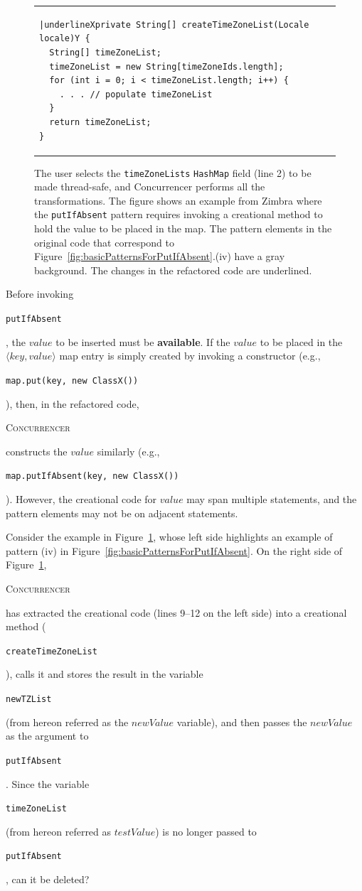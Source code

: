 \documentclass[10pt,twocolumn]{article}
\newcommand{\tool}{\begin{scriptsize}\textsc{Concurrencer}\end{scriptsize}\xspace}
\newenvironment{CodeOut}{\begin{scriptsize}}{\end{scriptsize}}
\newcommand{\code}[1]{\begin{smaller}\texttt{#1}\end{smaller}}
\newcommand{\codex}[1]{{\smaller\texttt{#1}}\xspace}
\newcommand{\MaxWidth}{\columnwidth}
\begin{document}
\begin{figure}[t]
\begin{CodeOut}
\begin{tabular}{@{}l|l@{}}
\begin{minipage}[t]{\MaxWidth}
\begin{Verbatim}[commandchars=\|XY]
|underlineXprivate String[] createTimeZoneList(Locale locale)Y {
  String[] timeZoneList;
  timeZoneList = new String[timeZoneIds.length];
  for (int i = 0; i < timeZoneList.length; i++) {
    . . . // populate timeZoneList
  }
  return timeZoneList;
}
\end{Verbatim}
\end{minipage}
\end{tabular}
\end{CodeOut}
\caption{The user selects the \codex{timeZoneLists} \codex{HashMap} field (line
2) to be made thread-safe, and Concurrencer performs all the transformations.
The figure shows an example from Zimbra where the \codex{putIfAbsent} pattern
requires invoking a creational method to hold the value to be placed in the map.
The pattern elements in the original code that correspond to
Figure~\ref{fig:basicPatternsForPutIfAbsent}.(iv) have a gray background.
The changes in the refactored code are underlined.}
\label{fig:putIfAbsentWithCreateValue}
\end{figure}


Before invoking \code{putIfAbsent}, the $\mathit{value}$ to be inserted must be
\textbf{available}. If the $\mathit{value}$ to be placed
in the $\langle\mathit{key,value}\rangle$ map entry is simply created by
invoking a constructor (e.g., \code{map.put(key, new ClassX())}), then, in the
refactored code, \tool constructs the $\mathit{value}$ similarly (e.g.,
\code{map.putIfAbsent(key, new ClassX())}). However, the
creational code for $\mathit{value}$ may span multiple statements, and the pattern
elements may not be on adjacent statements.


Consider the example in Figure~\ref{fig:putIfAbsentWithCreateValue}, whose
left side highlights an example of pattern (iv) in
Figure~\ref{fig:basicPatternsForPutIfAbsent}.
On the right side of Figure~\ref{fig:putIfAbsentWithCreateValue}, 
 \tool has extracted the creational
code (lines 9--12 on the left side) into a creational method (\code{createTimeZoneList}), calls it and stores
the result in the variable \code{newTZList} (from hereon referred as
the $\mathit{newValue}$ variable), and then passes the
$\mathit{newValue}$ as the argument to \code{putIfAbsent}. Since the
variable \code{timeZoneList} (from hereon referred as $\mathit{testValue}$) is
no longer passed to \code{putIfAbsent}, can it be deleted?
\end{document}
